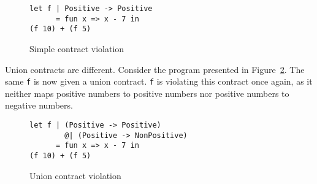 \documentclass[sigplan,10pt,review,anonymous]{acmart}
\newcommand{\nickel}[1]{\lstinline[language=nickel]{#1}}
\begin{document}
%

\begin{figure}[h]
\begin{lstlisting}[language=nickel]
let f | Positive -> Positive
      = fun x => x - 7 in
(f 10) + (f 5)
\end{lstlisting}
\caption{Simple contract violation}
\label{fig:pos-to-pos}
\end{figure}

%

Union contracts are different. Consider the program presented in
Figure~\ref{fig:wrong-union-function}. The same \nickel{f} is now given a union
contract. \nickel{f} is violating this contract once again, as it neither maps
positive numbers to positive numbers nor positive numbers to negative numbers.

\begin{figure}[h]
\begin{lstlisting}[language=nickel]
let f | (Positive -> Positive)
        @| (Positive -> NonPositive)
      = fun x => x - 7 in
(f 10) + (f 5)
\end{lstlisting}
\caption{Union contract violation}
\label{fig:wrong-union-function}
\end{figure}
\end{document}
